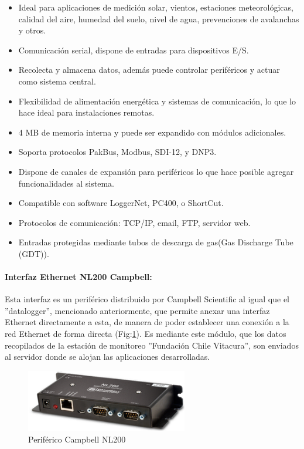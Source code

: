 \begin{itemize}
\item Ideal para aplicaciones de medición solar, vientos, estaciones meteorológicas, calidad del aire, humedad del suelo, nivel de agua, prevenciones de avalanchas y otros.
\item Comunicación serial, dispone de entradas para dispositivos E/S.
\item Recolecta y almacena datos, además puede controlar periféricos y actuar como sistema central.
\item Flexibilidad de alimentación energética y sistemas de comunicación, lo que lo hace ideal para instalaciones remotas.
\item 4 MB de memoria interna y puede ser expandido con módulos adicionales.
\item Soporta protocolos PakBus, Modbus, SDI-12, y DNP3.
\item Dispone de canales de expansión para periféricos lo que hace posible agregar funcionalidades al sistema.
\item Compatible con software LoggerNet, PC400, o ShortCut.
\item Protocolos de comunicación: TCP/IP, email, FTP, servidor web.
\item Entradas protegidas mediante tubos de descarga de gas(Gas Discharge Tube (GDT)).
\end{itemize}

\paragraph{Interfaz Ethernet NL200 Campbell:}
Esta interfaz es un periférico distribuido por Campbell Scientific al igual que el ''datalogger'', mencionado anteriormente, que permite anexar una interfaz Ethernet directamente a esta, de manera de poder establecer una conexión a la red Ethernet de forma directa (Fig:\ref{nl200}). Es mediante este módulo, que los datos recopilados de la estación de monitoreo ''Fundación Chile Vitacura'', son enviados al servidor donde se alojan las aplicaciones desarrolladas.\\

\begin{figure}[h!]
        \centering
        \includegraphics[width=200pt]{images/nl200}
        \caption{Periférico Campbell NL200}
	\label{nl200} 
\end{figure}

